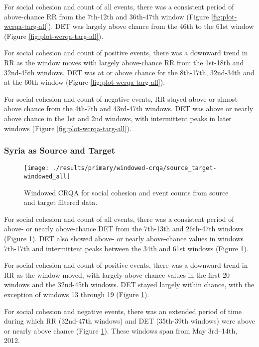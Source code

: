 \documentclass[english,man]{apa6}
\begin{document}
For social cohesion and count of all events, there was a consistent period
of above-chance RR from the 7th-12th and 36th-47th window
(Figure \ref{fig:plot-wcrqa-targ-all}). DET was largely above chance
from the 46th to the 61st window (Figure \ref{fig:plot-wcrqa-targ-all}).

For social cohesion and count of positive events, there was a downward trend in RR
as the window moves with largely above-chance RR from the 1st-18th and
32nd-45th windows. DET was at or above chance for the 8th-17th,
32nd-34th and at the 60th window (Figure \ref{fig:plot-wcrqa-targ-all}).

For social cohesion and count of negative events, RR stayed above
or almost above chance from the 4th-7th and 43rd-47th windows. DET
was above or nearly above chance in the 1st and 2nd windows, with intermittent
peaks in later windows (Figure \ref{fig:plot-wcrqa-targ-all}).

\hypertarget{syria-as-source-and-target-1}{%
\subsubsection{Syria as Source and Target}\label{syria-as-source-and-target-1}}

\begin{figure}
\texttt{[image: ./results/primary/windowed-crqa/source\_target-windowed\_all]} \caption{Windowed CRQA for social cohesion and event counts from source and target filtered data.}\label{fig:plot-wcrqa-source-targ-all}
\end{figure}

For social cohesion and count of all events, there was a consistent period of
above- or nearly above-chance DET from the 7th-13th and 26th-47th
windows (Figure \ref{fig:plot-wcrqa-source-targ-all}). DET also
showed above- or nearly above-chance values in windows 7th-17th and
intermittent peaks between the 34th and 61st windows (Figure
\ref{fig:plot-wcrqa-source-targ-all}).

For social cohesion and count of
positive events, there was a downward trend in RR as the window moved, with
largely above-chance values in the first 20 windows and the 32nd-45th windows.
DET stayed largely within chance, with the exception of windows 13
through 19 (Figure \ref{fig:plot-wcrqa-source-targ-all}).

For social cohesion
and negative events, there was an extended period of time during which RR
(32nd-47th windows) and DET (35th-39th windows) were above or nearly above
chance (Figure \ref{fig:plot-wcrqa-source-targ-all}). These windows span from
May 3rd--14th, 2012.
\end{document}
